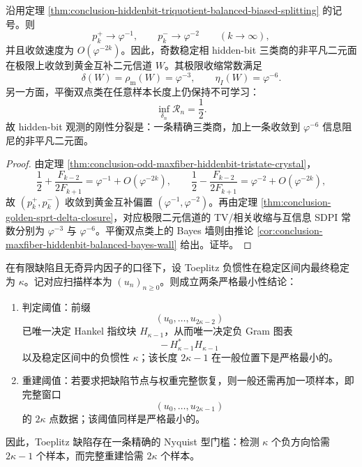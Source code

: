 \begin{corollary}[偏置二面体的黄金极限与互信息阻尼]\label{cor:conclusion-hiddenbit-biased-face-golden-damping}
沿用定理 \ref{thm:conclusion-hiddenbit-triquotient-balanced-biased-splitting} 的记号。则
\[
p_k^+\to \varphi^{-1},
\qquad
p_k^-\to \varphi^{-2}
\qquad (k\to\infty),
\]
并且收敛速度为 \(O(\varphi^{-2k})\)。因此，奇数稳定相 hidden-bit 三类商的非平凡二元面在极限上收敛到黄金互补二元信道 \(W\)。其极限收缩常数满足
\[
\delta(W)=\rho_{\mathrm m}(W)=\varphi^{-3},
\qquad
\eta_I(W)=\varphi^{-6}.
\]
另一方面，平衡双点类在任意样本长度上仍保持不可学习：
\[
\inf_{\delta_n}\mathcal R_n=\frac12.
\]
故 hidden-bit 观测的刚性分裂是：一条精确三类商，加上一条收敛到 \(\varphi^{-6}\) 信息阻尼的非平凡二元面。
\end{corollary}

\begin{proof}
由定理 \ref{thm:conclusion-odd-maxfiber-hiddenbit-tristate-crystal}，
\[
\frac12+\frac{F_{k-2}}{2F_{k+1}}
=
\varphi^{-1}+O(\varphi^{-2k}),
\qquad
\frac12-\frac{F_{k-2}}{2F_{k+1}}
=
\varphi^{-2}+O(\varphi^{-2k}),
\]
故 \((p_k^+,p_k^-)\) 收敛到黄金互补偏置 \((\varphi^{-1},\varphi^{-2})\)。再由定理 \ref{thm:conclusion-golden-sprt-delta-closure}，对应极限二元信道的 TV/相关收缩与互信息 SDPI 常数分别为 \(\varphi^{-3}\) 与 \(\varphi^{-6}\)。平衡双点类上的 Bayes 墙则由推论 \ref{cor:conclusion-maxfiber-hiddenbit-balanced-bayes-wall} 给出。证毕。
\end{proof}

\begin{theorem}\label{thm:conclusion-toeplitz-defect-exact-nyquist-threshold}
在有限缺陷且无奇异内因子的口径下，设 Toeplitz 负惯性在稳定区间内最终稳定为 \(\kappa\)。记对应扫描样本为 \((u_n)_{n\ge 0}\)。则成立两条严格最小性结论：
\begin{enumerate}
\normalfont
  \item 判定阈值：前缀
  \[
  (u_0,\dots,u_{2\kappa-2})
  \]
  已唯一决定 Hankel 指纹块 \(H_{\kappa-1}\)，从而唯一决定负 Gram 图表
  \[
  -\,H_{\kappa-1}^{*}H_{\kappa-1}
  \]
  以及稳定区间中的负惯性 \(\kappa\)；该长度 \(2\kappa-1\) 在一般位置下是严格最小的。
  \item 重建阈值：若要求把缺陷节点与权重完整恢复，则一般还需再加一项样本，即完整窗口
  \[
  (u_0,\dots,u_{2\kappa-1})
  \]
  的 \(2\kappa\) 点数据；该阈值同样是严格最小的。
\end{enumerate}
因此，Toeplitz 缺陷存在一条精确的 Nyquist 型门槛：检测 \(\kappa\) 个负方向恰需 \(2\kappa-1\) 个样本，而完整重建恰需 \(2\kappa\) 个样本。
\end{theorem}

